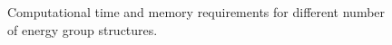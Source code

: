 \documentclass[11pt,letterpaper]{article}
\begin{document}
\begin{figure}[htbp!]
	\centering
	\hfill
	\caption{Computational time and memory requirements for different number of energy group structures.}
	\label{fig:assembly-time}
\end{figure}
\end{document}
